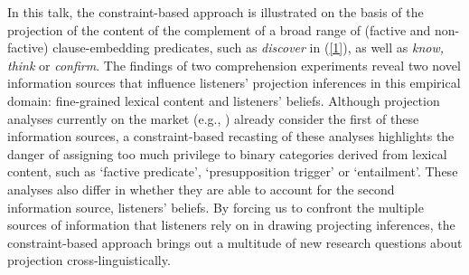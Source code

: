 \documentclass[12pt,fleqn]{article}
\newcommand{\6}{\mbox{$[\hspace*{-.6mm}[$}}
\newcommand{\9}{\mbox{$]\hspace*{-.6mm}]$}}
\begin{document}
\noindent
In this talk, the constraint-based approach is illustrated on the basis of the projection of the content of the complement of a broad range of (factive and non-factive) clause-embedding predicates, such as {\em discover} in (\ref{1}), as well as {\em  know, think} or {\em confirm}. The findings of two comprehension experiments reveal two novel information sources that influence listeners' projection inferences in this empirical domain: fine-grained lexical content and listeners' beliefs. Although projection analyses currently on the market (e.g., \citealt{abusch10,abrusan2011,heim83,best-question,schlenker-ms}) already consider the first of these information sources, a constraint-based recasting of these analyses highlights the danger of assigning too much privilege to binary categories derived from lexical content, such as `factive predicate', `presupposition trigger' or `entailment'. These analyses also differ in whether they are able to account for the second information source, listeners' beliefs. By forcing us to confront the multiple sources of information that listeners rely on in drawing projecting inferences, the constraint-based approach brings out a multitude of new research questions about projection cross-linguistically.


\end{document}
